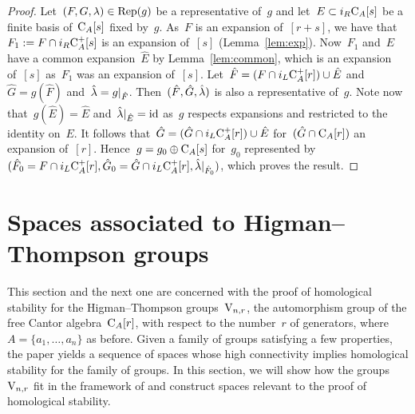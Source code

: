 \begin{proof}
Let~$(F,G,\lambda)\in \operatorname{Rep}(g)$ be a representative of~$g$ and let~$E\subset i_R\mathrm{C}_A[s]$ be a finite basis of~$\mathrm{C}_A[s]$ fixed by~$g$. As~$F$ is an expansion of~$[r+s]$, we have that~$F_1:=F\cap i_R\mathrm{C}_A^+[s]$ is an expansion of~$[s]$ (Lemma~\ref{lem:exp}). Now~$F_1$ and~$E$ have a common expansion~$\hat E$ by Lemma~\ref{lem:common}, which is an expansion of~$[s]$ as~$F_1$ was an expansion of~$[s]$. Let~$\hat F=(F\cap i_L\mathrm{C}_A^+[r])\cup \hat E$ and~$\hat G=g(\hat F)$ and~$\hat {\lambda}=g|_{\hat F}$. 
Then~$(\hat F,\hat G,\hat {\lambda})$ is also a representative of~$g$. Note now that~$g(\hat E)=\hat E$ and~$\hat{\lambda}|_{\hat E}=\operatorname{id}$ as~$g$ respects expansions and restricted to the identity on~$E$. 
It follows that~$\hat G=(\hat G\cap i_L\mathrm{C}_A^+[r])\cup \hat E$ for~$(\hat G\cap \mathrm{C}_A[r])$ an expansion of~$[r]$. Hence~$g=g_0\oplus \mathrm{C}_A[s]$ for~$g_0$ represented by~$(\hat F_0=F\cap i_L\mathrm{C}_A^+[r],\hat G_0=\hat G\cap i_L\mathrm{C}_A^+[r], \hat{\lambda}|_{\hat F_0})$, which proves the result.  
\end{proof}





\section{Spaces associated to Higman--Thompson groups}\label{sec:spaces}

This section and the  next one are concerned with the proof of homological stability for the Higman--Thompson groups~$\mathrm{V}_{n,r}$, the automorphism group of the free Cantor algebra~$\mathrm{C}_{A}[r]$, with respect to the number~$r$ of generators, where~$A=\{a_1,\dots,a_n\}$ as before. 
Given a family of groups satisfying a few properties, the 
paper  \cite{Randal-Williams+Wahl}  yields  a sequence of spaces whose high connectivity implies homological stability for the family of groups. In this section, we will show how 
the groups~$\mathrm{V}_{n,r}$ fit in the framework of \cite{Randal-Williams+Wahl} and construct spaces relevant to the proof of homological stability. %



